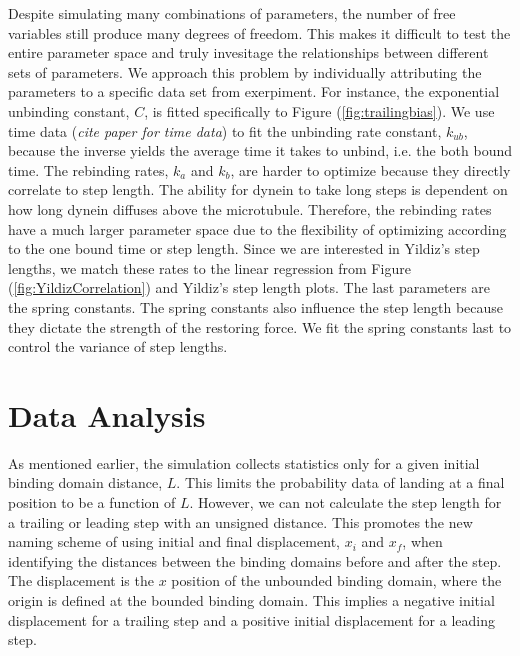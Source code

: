 Despite simulating many combinations of parameters, the number of free variables still produce many degrees of freedom. This makes it difficult to test the entire parameter space and truly invesitage the relationships between different sets of parameters. We approach this problem by individually attributing the parameters to a specific data set from exerpiment. For instance, the exponential unbinding constant, $C$, is fitted specifically to Figure (\ref{fig:trailingbias}). We use time data (\textit{cite paper for time data}\cite{}) to fit the unbinding rate constant, $k_{ub}$, because the inverse yields the average time it takes to unbind, i.e. the both bound time. The rebinding rates, $k_a$ and $k_b$, are harder to optimize because they directly correlate to step length. The ability for dynein to take long steps is dependent on how long dynein diffuses above the microtubule. Therefore, the rebinding rates have a much larger parameter space due to the flexibility of optimizing according to the one bound time or step length. Since we are interested in Yildiz's step lengths, we match these rates to the linear regression from Figure (\ref{fig:YildizCorrelation}) and Yildiz's step length plots. The last parameters are the spring constants. The spring constants also influence the step length because they dictate the strength of the restoring force. We fit the spring constants last to control the variance of step lengths.




\section{Data Analysis} \label{sec:DataAna}
As mentioned earlier, the simulation collects statistics only for a given initial binding domain distance, $L$. This limits the probability data of landing at a final position to be a function of $L$. However, we can not calculate the step length for a trailing or leading step with an unsigned distance. This promotes the new naming scheme of using initial and final displacement, $x_i$ and $x_f$, when identifying the distances between the binding domains before and after the step. The displacement is the $x$ position of the unbounded binding domain, where the origin is defined at the bounded binding domain. This implies a negative initial displacement for a trailing step and a positive initial displacement for a leading step. 

